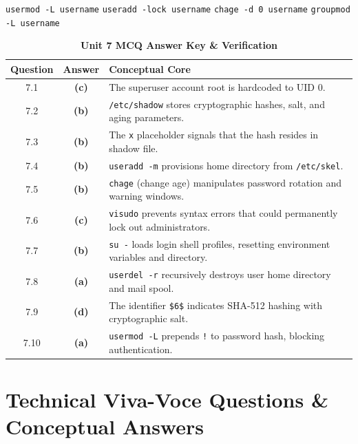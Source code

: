 {\texttt{usermod -L username}}
{\texttt{useradd -lock username}}
{\texttt{chage -d 0 username}}
{\texttt{groupmod -L username}}

\begin{table}[htbp]
\centering
\caption{\textbf{Unit 7 MCQ Answer Key \& Verification}}
\begin{tabularx}{0.85\linewidth}{c c X}
\toprule
\textbf{Question} & \textbf{Answer} & \textbf{Conceptual Core} \\
\midrule
7.1 & \textbf{(c)} & The superuser account root is hardcoded to UID 0. \\
7.2 & \textbf{(b)} & \texttt{/etc/shadow} stores cryptographic hashes, salt, and aging parameters. \\
7.3 & \textbf{(b)} & The \texttt{x} placeholder signals that the hash resides in shadow file. \\
7.4 & \textbf{(b)} & \texttt{useradd -m} provisions home directory from \texttt{/etc/skel}. \\
7.5 & \textbf{(b)} & \texttt{chage} (change age) manipulates password rotation and warning windows. \\
7.6 & \textbf{(c)} & \texttt{visudo} prevents syntax errors that could permanently lock out administrators. \\
7.7 & \textbf{(b)} & \texttt{su -} loads login shell profiles, resetting environment variables and directory. \\
7.8 & \textbf{(a)} & \texttt{userdel -r} recursively destroys user home directory and mail spool. \\
7.9 & \textbf{(d)} & The identifier \texttt{\$6\$} indicates SHA-512 hashing with cryptographic salt. \\
7.10 & \textbf{(a)} & \texttt{usermod -L} prepends \texttt{!} to password hash, blocking authentication. \\
\bottomrule
\end{tabularx}
\end{table}

\section{Technical Viva-Voce Questions \& Conceptual Answers}

